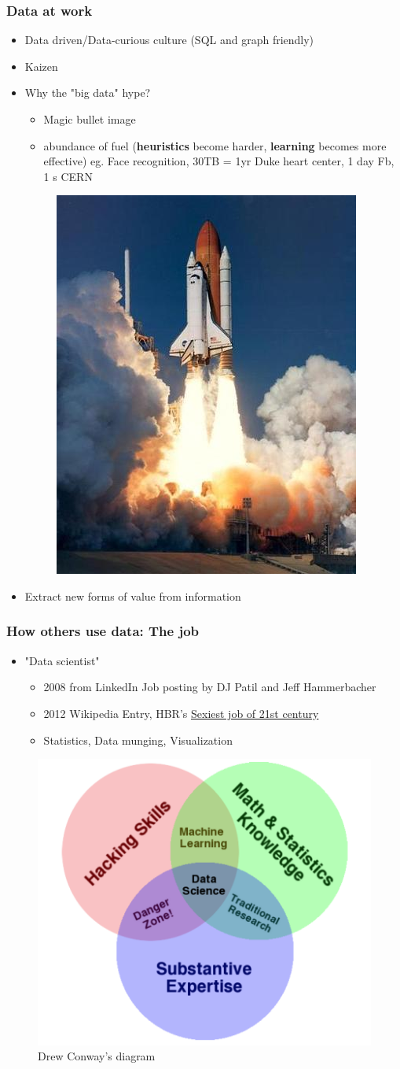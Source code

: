 \documentclass{beamer}
\begin{document}

\begin{frame}
	\frametitle{Data at work}
	\begin{itemize}
		\item Data driven/Data-curious culture (SQL and graph friendly)
		\item Kaizen
		\item Why the "big data" hype?
			\begin{itemize}
				\item Magic bullet image
				\item abundance of fuel (\textbf{heuristics} become harder, \textbf{learning} becomes more effective) eg. Face recognition, 30TB = 1yr Duke heart center, 1 day Fb, 1 s CERN
			\end{itemize}		
			\begin{figure}
				\centering
				\includegraphics[width=0.25\linewidth]{rocket}
			\end{figure}
			\item Extract new forms of value from information
	\end{itemize}
\end{frame}


\begin{frame}
	\frametitle{How others use data: The job}
	\begin{itemize}
		\item "Data scientist"
		\begin{itemize}
			\item 2008 from LinkedIn Job posting by DJ Patil and Jeff Hammerbacher
			\item 2012 Wikipedia Entry, HBR's \href{https://hbr.org/2012/10/data-scientist-the-sexiest-job-of-the-21st-century/}{Sexiest job of 21st century}
			\item Statistics, Data munging, Visualization
		\end{itemize}
	\end{itemize}
	\begin{figure}
		\centering
		\includegraphics[width=0.4\linewidth]{drew_conway}
		\caption{Drew Conway's diagram}
	\end{figure}
\end{frame}
\end{document}
